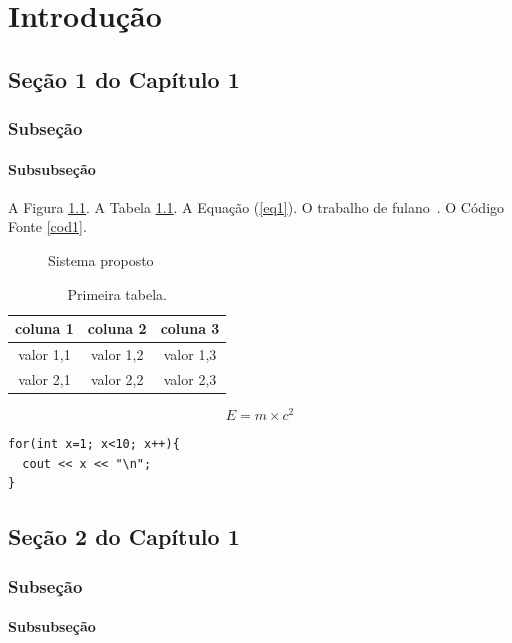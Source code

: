 \chapter{Introdução}

\section{Seção 1 do Capítulo 1}
\subsection{Subseção}
\subsubsection{Subsubseção}

A Figura \ref{fig:sistemaProposto}. A Tabela \ref{tab:tabelaTeste}. A Equação (\ref{eq1}). O trabalho de fulano~\cite{ref1}. O Código Fonte \ref{cod1}.

\begin{figure}[htbp]	
\begin{center}
	\end{center}
	\caption{Sistema proposto}
	\label{fig:sistemaProposto}
\end{figure}

\begin{table}[htpb]
\begin{center}
\begin{tabular}{|c|c|c|}
\hline
coluna 1 & coluna 2 & coluna 3 \\
\hline
valor 1,1 & valor 1,2 & valor 1,3 \\
valor 2,1 & valor 2,2 & valor 2,3 \\
\hline
\end{tabular}
\end{center}
\caption{Primeira tabela.}
\label{tab:tabelaTeste}
\end{table}

\begin{equation}
E = m \times c^2
\label{eq1}
\end{equation}

\begin{lstlisting}[caption={Loop simples},label=cod1,numbers=none]
for(int x=1; x<10; x++){
  cout << x << "\n";
}
\end{lstlisting}

\section{Seção 2 do Capítulo 1}
\subsection{Subseção}
\subsubsection{Subsubseção}

